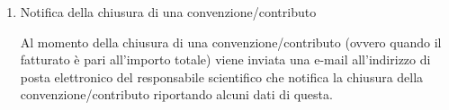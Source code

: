 \begin{enumerate}
\begin{enumerate}
  
 \item Notifica della chiusura di una convenzione/contributo\\ \label{UC_notify_closed_contract}
 
    Al momento della chiusura di una convenzione/contributo (ovvero quando il fatturato è pari all'importo totale) viene inviata una e-mail all'indirizzo di posta elettronico del responsabile scientifico che notifica la chiusura della
    convenzione/contributo riportando alcuni dati di questa.
\end{enumerate}


\end{enumerate}

